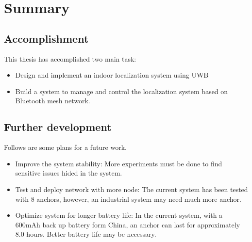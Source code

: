 \documentclass[\main/main.tex]{subfiles}
\begin{document}
\graphicspath{{img/}{summary/img/}}

\chapter{Summary}

\section{Accomplishment}
This thesis has accomplished two main task:
\begin{itemize}
    \item Design and implement an indoor localization system using UWB
    \item Build a system to manage and control the localization system based on Bluetooth mesh network.
\end{itemize}

\section{Further development}
Follows are some plans for a future work.
\begin{itemize}
    \item Improve the system stability: More experiments must be done to find sensitive issues hided in the system.
    \item Test and deploy network with more node: The current system has been tested with 8 anchors, however, an industrial system may need much more anchor.
    \item Optimize system for longer battery life: In the current system, with a 600mAh back up battery form China, an anchor can last for approximately 8.0 hours. Better battery life may be necessary.
\end{itemize}
\end{document}
